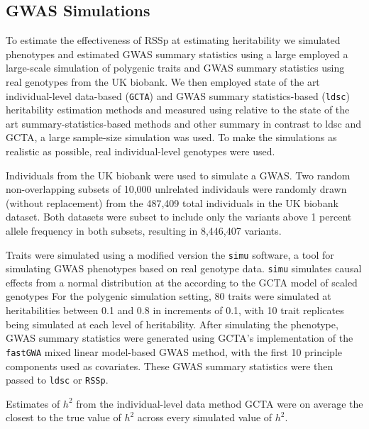 \subsection{GWAS Simulations}
To estimate the effectiveness of RSSp at estimating heritability we simulated phenotypes and estimated GWAS summary statistics using a large employed a large-scale simulation of polygenic traits and GWAS summary statistics using real genotypes from the UK biobank.  We then employed state of the art individual-level data-based (\texttt{GCTA}\cite{GCTA}) and GWAS summary statistics-based (\texttt{ldsc}\cite{ldsc}) heritability estimation methods and measured  using   relative to the state of the art summary-statistics-based methods and  other summary  in contrast to ldsc and GCTA, a large sample-size simulation was used.  To make the simulations as realistic as possible, real individual-level genotypes were used.

Individuals from the UK biobank were used to simulate a GWAS. Two random non-overlapping subsets of 10,000 unlrelated individauls were randomly drawn (without replacement) from the 487,409 total individuals in the UK biobank dataset.  Both datasets were subset to include only the variants above 1 percent allele frequency in both subsets, resulting in 8,446,407 variants.

Traits were simulated using a modified version the \texttt{simu} software\cite{simu}, a tool for simulating GWAS phenotypes based on real genotype data.  \texttt{simu} simulates causal effects from a normal distribution at the according to the GCTA model of scaled genotypes For the polygenic simulation setting, 80 traits were simulated at heritabilities between 0.1 and 0.8 in increments of 0.1, with 10 trait replicates
being simulated at each level of  heritability.  After simulating the phenotype, GWAS summary statistics were generated using GCTA's implementation of the \texttt{fastGWA} mixed linear model-based GWAS method, with the first 10 principle components used as covariates.  These GWAS summary statistics were then passed to \texttt{ldsc} or \texttt{RSSp}.


Estimates of $h^2$ from the individual-level data method GCTA were on average the closest to the true value of $h^2$ across every simulated value of $h^2$. 


